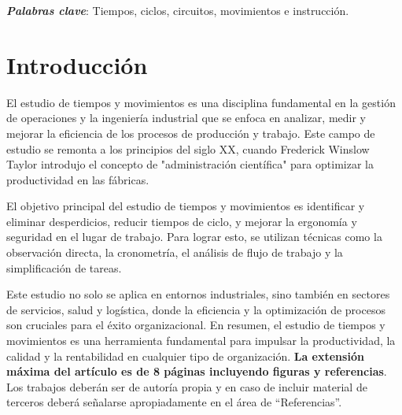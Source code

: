      
     
     
     \textbf{\textit{Palabras clave}}: {Tiempos, ciclos, circuitos, movimientos e instrucción.}
     
     \section{Introducción}
     
     El estudio de tiempos y movimientos es una disciplina fundamental en la gestión de operaciones y la ingeniería industrial que se enfoca en analizar, medir y mejorar la eficiencia de los procesos de producción y trabajo. Este campo de estudio se remonta a los principios del siglo XX, cuando Frederick Winslow Taylor introdujo el concepto de "administración científica" para optimizar la productividad en las fábricas.
     
     El objetivo principal del estudio de tiempos y movimientos es identificar y eliminar desperdicios, reducir tiempos de ciclo, y mejorar la ergonomía y seguridad en el lugar de trabajo. Para lograr esto, se utilizan técnicas como la observación directa, la cronometría, el análisis de flujo de trabajo y la simplificación de tareas.
     
     Este estudio no solo se aplica en entornos industriales, sino también en sectores de servicios, salud y logística, donde la eficiencia y la optimización de procesos son cruciales para el éxito organizacional. En resumen, el estudio de tiempos y movimientos es una herramienta fundamental para impulsar la productividad, la calidad y la rentabilidad en cualquier tipo de organización.
     \textbf{La extensión máxima del artículo es de 8 páginas incluyendo figuras y referencias}. Los trabajos deberán ser de autoría propia y en caso de incluir material de terceros deberá señalarse apropiadamente en el área de “Referencias”.
     

